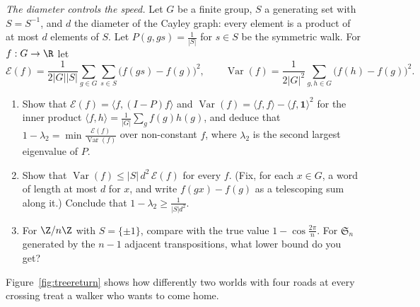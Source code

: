 \begin{exercise}[$\star\star\star$]\label{pb:gapdiam}
\emph{The diameter controls the speed.} Let $G$ be a finite group, $S$ a generating set with $S=S^{-1}$, and $d$ the diameter of the
Cayley graph: every element is a product of at most $d$ elements of $S$. Let $P(g,gs)=\frac1{|S|}$ for $s\in S$ be the symmetric walk.
For $f:G\to\R$ let
\[
\mathcal E(f)=\frac1{2|G||S|}\sum_{g\in G}\sum_{s\in S}\bigl(f(gs)-f(g)\bigr)^2,\qquad\operatorname{Var}(f)=\frac1{2|G|^2}\sum_{g,h\in G}\bigl(f(h)-f(g)\bigr)^2.
\]
\begin{enumerate}[label=(\alph*)]
\item Show that $\mathcal E(f)=\langle f,(I-P)f\rangle$ and $\operatorname{Var}(f)=\langle f,f\rangle-\langle f,\mathbf 1\rangle^2$ for the inner product $\langle f,h\rangle=\frac1{|G|}\sum_gf(g)h(g)$, and deduce
that $1-\lambda_2=\min\frac{\mathcal E(f)}{\operatorname{Var}(f)}$ over non-constant $f$, where $\lambda_2$ is the second largest eigenvalue of $P$.
\item Show that $\operatorname{Var}(f)\le|S|\,d^2\,\mathcal E(f)$ for every $f$. (Fix, for each $x\in G$, a word of length at most $d$ for $x$, and write $f(gx)-f(g)$ as a
telescoping sum along it.) Conclude that $1-\lambda_2\ge\frac1{|S|d^2}$.
\item For $\Z/n\Z$ with $S=\{\pm1\}$, compare with the true value $1-\cos\frac{2\pi}n$. For $\mathfrak S_n$ generated by the $n-1$ adjacent transpositions,
what lower bound do you get?
\end{enumerate}
\end{exercise}

Figure~\ref{fig:treereturn} shows how differently two worlds with four roads at every crossing treat a walker who wants to come home.

